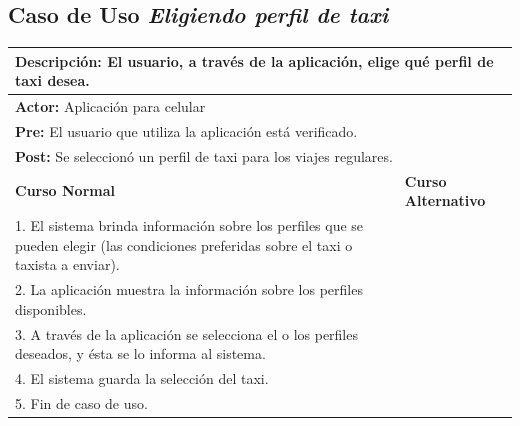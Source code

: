 \documentclass[a4paper]{article}
\begin{document}
\subsection{Caso de Uso \textit{Eligiendo perfil de taxi}}
\begin{center}
\begin{tabular}{|p{10cm} | p{6cm}|}
\hline
\multicolumn{2}{|p{16cm}|}{\textbf{Descripci\'on:} El usuario, a trav\'es de la aplicaci\'on, elige qu\'e perfil de taxi desea.} \\
\hline
\multicolumn{2}{|p{15cm}|}{\textbf{Actor:} Aplicaci\'on para celular } \\
\hline
\multicolumn{2}{|p{15cm}|}{\textbf{Pre:} El usuario que utiliza la aplicaci\'on est\'a verificado.} \\
\hline
\multicolumn{2}{|p{15cm}|}{\textbf{Post:} Se seleccion\'o un perfil de taxi para los viajes regulares.}\\
\hline
\textbf{Curso Normal}  & \textbf{Curso Alternativo} \\ \hline
1. El sistema brinda informaci\'on sobre los perfiles que se pueden elegir (las condiciones preferidas sobre el taxi o taxista a enviar).  & \\ \hline
2. La aplicaci\'on muestra la informaci\'on sobre los perfiles disponibles. & \\ \hline
3. A trav\'es de la aplicaci\'on se selecciona el o los perfiles deseados, y \'esta se lo informa al sistema. & \\ \hline
4. El sistema guarda la selecci\'on del taxi. & \\ \hline
5. Fin de caso de uso. & \\ \hline
\end{tabular}
\end{center}
\end{document}
